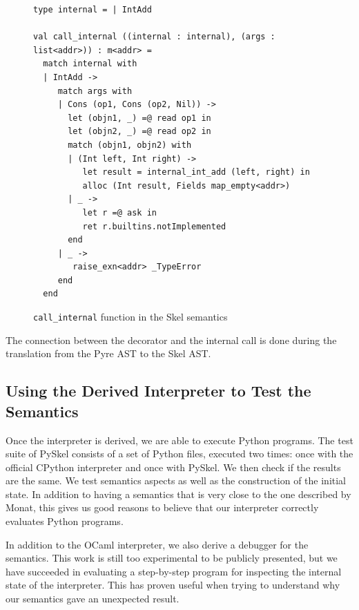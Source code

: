 \documentclass[submission,copyright,creativecommons]{eptcs}
\begin{document}
\begin{figure}[ht]
  \centering
  \begin{minipage}{0.9\textwidth}
    \begin{verbatim}
type internal = | IntAdd

val call_internal ((internal : internal), (args : list<addr>)) : m<addr> =
  match internal with
  | IntAdd ->
     match args with
     | Cons (op1, Cons (op2, Nil)) ->
       let (objn1, _) =@ read op1 in
       let (objn2, _) =@ read op2 in
       match (objn1, objn2) with
       | (Int left, Int right) ->
          let result = internal_int_add (left, right) in
          alloc (Int result, Fields map_empty<addr>)
       | _ ->
          let r =@ ask in
          ret r.builtins.notImplemented
       end
     | _ ->
        raise_exn<addr> _TypeError
     end
  end
    \end{verbatim}
  \end{minipage}
  \caption{\label{fig:call internal}\texttt{call_internal} function in the Skel semantics}
\end{figure}

The connection between the decorator and the internal call is done during the
translation from the Pyre AST to the Skel AST.

\subsection{Using the Derived Interpreter to Test the Semantics}
Once the interpreter is derived, we are able to execute Python programs.
The test suite of PySkel consists of a set of Python files, executed two times: once with the official CPython interpreter and once with PySkel.
We then check if the results are the same.
We test semantics aspects as well as the construction of the initial state.
In addition to having a semantics that is very close to the one described by
Monat, this gives us good reasons to believe that our interpreter correctly evaluates Python programs.

In addition to the OCaml interpreter, we also derive a debugger for the semantics.
This work is still too experimental to be publicly presented, but we have
succeeded in evaluating a step-by-step program for inspecting the internal state
of the interpreter. This has proven useful when trying to understand why our
semantics gave an unexpected result.
\end{document}
